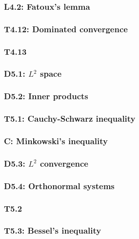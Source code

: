 \documentclass{article}
\begin{document}
\begin{multicols*}{3}
\subsubsection*{L4.2: Fatoux's lemma}

\subsubsection*{T4.12: Dominated convergence}

\subsubsection*{T4.13}

\subsubsection*{D5.1: $L^2$ space}

\subsubsection*{D5.2: Inner products}

\subsubsection*{T5.1: Cauchy-Schwarz inequality}

\subsubsection*{C: Minkowski's inequality}

\subsubsection*{D5.3: $L^2$ convergence}

\subsubsection*{D5.4: Orthonormal systems}

\subsubsection*{T5.2}

\subsubsection*{T5.3: Bessel's inequality}


\end{multicols*}
\end{document}

